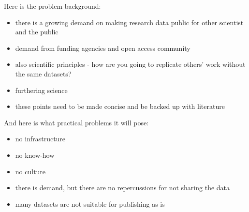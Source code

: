 Here is the problem background:

\begin{itemize}
    \item there is a growing demand on making research data public for other
          scientist and the public
    \item demand from funding agencies and open access community
    \item also scientific principles - how are you going to replicate others'
          work without the same datasets?
    \item furthering science
    \item these points need to be made concise and be backed up with literature
\end{itemize}

And here is what practical problems it will pose:

\begin{itemize}
    \item no infrastructure
    \item no know-how
    \item no culture
    \item there is demand, but there are no repercussions for not sharing the
          data
    \item many datasets are not suitable for publishing as is
\end{itemize}

\fi
